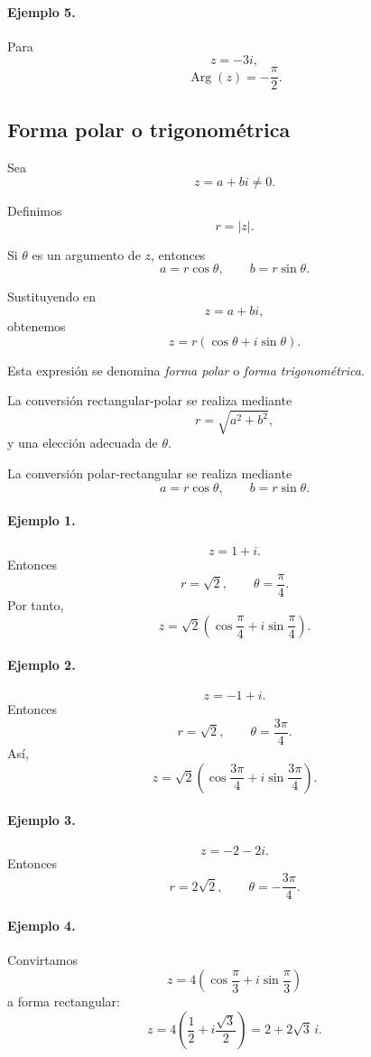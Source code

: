 \paragraph{Ejemplo 5.}
Para
\[
z=-3i,
\]
\[
\operatorname{Arg}(z)=-\frac{\pi}{2}.
\]

\subsection{Forma polar o trigonométrica}

Sea
\[
z=a+bi\neq0.
\]

Definimos
\[
r=|z|.
\]

Si $\theta$ es un argumento de $z$, entonces
\[
a=r\cos\theta,
\qquad
b=r\sin\theta.
\]

Sustituyendo en
\[
z=a+bi,
\]
obtenemos
\[
\boxed{
z
=
r(\cos\theta+i\sin\theta).
}
\]

Esta expresión se denomina \emph{forma polar} o \emph{forma trigonométrica}.

La conversión rectangular-polar se realiza mediante
\[
r=\sqrt{a^2+b^2},
\]
y una elección adecuada de $\theta$.

La conversión polar-rectangular se realiza mediante
\[
a=r\cos\theta,
\qquad
b=r\sin\theta.
\]

\paragraph{Ejemplo 1.}
\[
z=1+i.
\]
Entonces
\[
r=\sqrt2,
\qquad
\theta=\frac{\pi}{4}.
\]
Por tanto,
\[
z
=
\sqrt2
\left(
\cos\frac{\pi}{4}
+i\sin\frac{\pi}{4}
\right).
\]

\paragraph{Ejemplo 2.}
\[
z=-1+i.
\]
Entonces
\[
r=\sqrt2,
\qquad
\theta=\frac{3\pi}{4}.
\]
Así,
\[
z
=
\sqrt2
\left(
\cos\frac{3\pi}{4}
+i\sin\frac{3\pi}{4}
\right).
\]

\paragraph{Ejemplo 3.}
\[
z=-2-2i.
\]
Entonces
\[
r=2\sqrt2,
\qquad
\theta=-\frac{3\pi}{4}.
\]

\paragraph{Ejemplo 4.}
Convirtamos
\[
z
=
4\left(
\cos\frac{\pi}{3}
+i\sin\frac{\pi}{3}
\right)
\]
a forma rectangular:
\[
z
=
4\left(
\frac12+i\frac{\sqrt3}{2}
\right)
=
\boxed{2+2\sqrt3\,i}.
\]

